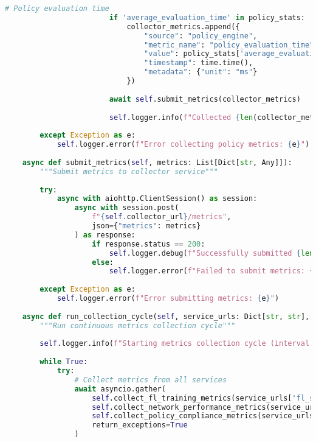 \begin{lstlisting}[language=python, caption=Custom Metrics Collector]
                        # Policy evaluation time
                        if 'average_evaluation_time' in policy_stats:
                            collector_metrics.append({
                                "source": "policy_engine",
                                "metric_name": "policy_evaluation_time",
                                "value": policy_stats['average_evaluation_time'],
                                "timestamp": time.time(),
                                "metadata": {"unit": "ms"}
                            })
                        
                        await self.submit_metrics(collector_metrics)
                        
                        self.logger.info(f"Collected {len(collector_metrics)} policy metrics")
        
        except Exception as e:
            self.logger.error(f"Error collecting policy metrics: {e}")
    
    async def submit_metrics(self, metrics: List[Dict[str, Any]]):
        """Submit metrics to collector service"""
        
        try:
            async with aiohttp.ClientSession() as session:
                async with session.post(
                    f"{self.collector_url}/metrics",
                    json={"metrics": metrics}
                ) as response:
                    if response.status == 200:
                        self.logger.debug(f"Successfully submitted {len(metrics)} metrics")
                    else:
                        self.logger.error(f"Failed to submit metrics: {response.status}")
        
        except Exception as e:
            self.logger.error(f"Error submitting metrics: {e}")
    
    async def run_collection_cycle(self, service_urls: Dict[str, str], interval: int = 30):
        """Run continuous metrics collection cycle"""
        
        self.logger.info(f"Starting metrics collection cycle (interval: {interval}s)")
        
        while True:
            try:
                # Collect metrics from all services
                await asyncio.gather(
                    self.collect_fl_training_metrics(service_urls['fl_server'], int(time.time())),
                    self.collect_network_performance_metrics(service_urls['sdn_controller']),
                    self.collect_policy_compliance_metrics(service_urls['policy_engine']),
                    return_exceptions=True
                )
                

\end{lstlisting}
